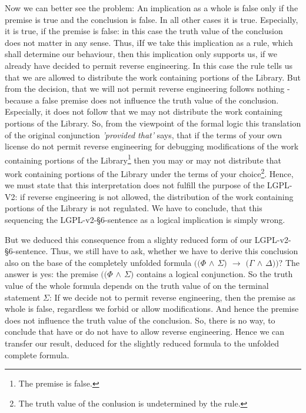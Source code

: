 Now we can better see the problem: An implication as a whole is false only if
the premise is true and the conclusion is false. In all other cases it is true.
Especially, it is true, if the premise is false: in this case the truth value of
the conclusion does not matter in any sense. Thus, iIf we take this implication
as a rule, which shall determine our behaviour, then this implication only
supports us, if we already have decided to permit reverse engineering. In this
case the rule tells us that we are allowed to distribute the work containing
portions of the Library. But from the decision, that we will not permit reverse
engineering follows nothing - because a false premise does not influence the
truth value of the conclusion. Especially, it does not follow that we may not
distribute the work containing portions of the Library. So, from the viewpoint
of the formal logic this translation of the original conjunction \emph{'provided
that'} says, that if the terms of your own license do not permit reverse
engineering for debugging modifications of the work containing portions of the
Library\footnote{The premise is false.} then you may or may not distribute that
work containing portions of the Library under the terms of your
choice\footnote{The truth value of the conlusion is undetermined by the rule.}.
Hence, we must state that this interpretation does not fulfill the purpose of
the LGPL-V2: if reverse engineering is not allowed, the distribution of the work
containing portions of the Library is not regulated. We have to conclude, that
this sequencing the LGPL-v2-§6-sentence as a logical implication is simply
wrong.

But we deduced this consequence from a slighty reduced form of our
LGPL-v2-§6-sentence. Thus, we still have to ask, whether we have to derive this
conclusion also on the base of the completely unfolded formula \emph{$((\Phi$
$\wedge$ $\Sigma)$ $\rightarrow$ $(\Gamma$ $\wedge$ $\Delta))$}? The answer is
yes: the premise \emph{$((\Phi$ $\wedge$ $\Sigma)$} contains a logical
conjunction. So the truth value of the whole formula depends on the truth value
of on the terminal statement $\Sigma$: If we decide not to permit reverse
engineering, then the premise as whole is false, regardless we forbid or allow
modifications. And hence the premise does not influence the truth value of the
conclusion. So, there is no way, to conclude that have or do not have to allow
reverse engineering. Hence we can transfer our result, deduced for the slightly
reduced formula to the unfolded complete formula.

